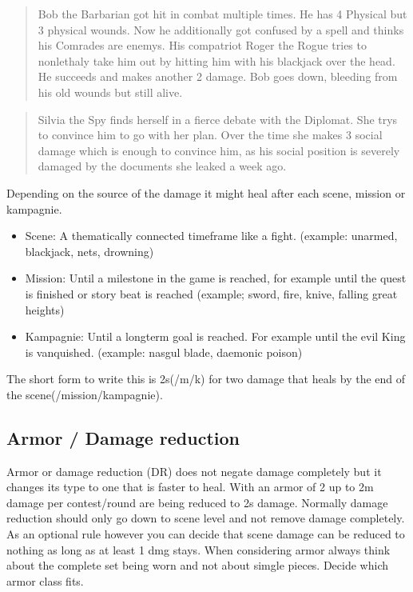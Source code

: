\documentclass[11pt]{article}
\begin{document}
{\begin{multicols}{2}[]
\begin{quote}
Bob the Barbarian got hit in combat multiple times. He has 4 Physical but 3 physical wounds. Now he additionally got confused by a spell and thinks his Comrades are enemys. His compatriot Roger the Rogue tries to nonlethaly take him out by hitting him with his blackjack over the head. He succeeds and makes another 2 damage. Bob goes down, bleeding from his old wounds but still alive.
\end{quote}

\begin{quote}
Silvia the Spy finds herself in a fierce debate with the Diplomat. She trys to convince him to go with her plan. Over the time she makes 3 social damage which is enough to convince him, as his social position is severely damaged by the documents she leaked a week ago.
\end{quote}

Depending on the source of the damage it might heal after each scene, mission or kampagnie.
\begin{itemize}
\item Scene: A thematically connected timeframe like a fight. (example: unarmed, blackjack, nets, drowning)
\item Mission: Until a milestone in the game is reached, for example until the quest is finished or story beat is reached (example; sword, fire, knive, falling great heights)
\item Kampagnie: Until a longterm goal is reached. For example until the evil King is vanquished. (example: nasgul blade, daemonic poison)
\end{itemize}
The short form to write this is 2s(/m/k) for two damage that heals by the end of the scene(/mission/kampagnie).

\subsection{Armor / Damage reduction}
\label{sec:org179c6e6}
Armor or damage reduction (DR) does not negate damage completely but it changes its type to one that is faster to heal. With an armor of 2 up to 2m damage per contest/round are being reduced to 2s damage. Normally damage reduction should only go down to scene level and not remove damage completely. As an optional rule however you can decide that scene damage can be reduced to nothing as long as at least 1 dmg stays. When considering armor always think about the complete set being worn and not about simgle pieces. Decide which armor class fits.


\end{multicols}}
\end{document}
